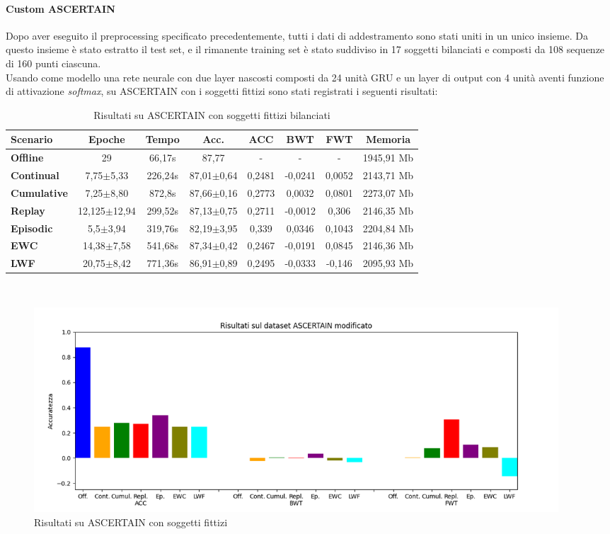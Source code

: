 \paragraph{Custom ASCERTAIN} Dopo aver eseguito il preprocessing specificato precedentemente, tutti i dati di addestramento sono stati uniti in un unico insieme. Da questo insieme è stato estratto il test set, e il rimanente training set è stato suddiviso in 17 soggetti bilanciati e composti da 108 sequenze di 160 punti ciascuna.\\
Usando come modello una rete neurale con due layer nascosti composti da 24 unità GRU e un layer di output con 4 unità aventi funzione di attivazione \textit{softmax}, su ASCERTAIN con i soggetti fittizi sono stati registrati i seguenti risultati:
\begin{table}[h]
\footnotesize
    \begin{tabular}{l|c|c|c|c|c|c|c}
        \textbf{Scenario} & \textbf{Epoche} & \textbf{Tempo} & \textbf{Acc.} & \textbf{ACC} & \textbf{BWT} & \textbf{FWT} & \textbf{Memoria}\\
        \hline
         \textbf{Offline} & 29 & 66,17s & 87,77 & - & - & - & 1945,91 Mb\\
        \textbf{Continual} & 7,75$\pm$5,33 & 226,24s & 87,01$\pm$0,64 & 0,2481 & -0,0241 & 0,0052 & 2143,71 Mb\\
        \textbf{Cumulative} & 7,25$\pm$8,80 & 872,8s & 87,66$\pm$0,16 & 0,2773 & 0,0032 & 0,0801 & 2273,07 Mb\\
        \textbf{Replay} & 12,125$\pm$12,94 & 299,52s & 87,13$\pm$0,75 & 0,2711 & -0,0012 & 0,306 & 2146,35 Mb\\
        \textbf{Episodic} & 5,5$\pm$3,94 & 319,76s & 82,19$\pm$3,95 & 0,339 & 0,0346 & 0,1043 & 2204,84 Mb\\
        \textbf{EWC} & 14,38$\pm$7,58 & 541,68s & 87,34$\pm$0,42 & 0,2467 & -0,0191 & 0,0845 & 2146,36 Mb\\
        \textbf{LWF} & 20,75$\pm$8,42 & 771,36s & 86,91$\pm$0,89 & 0,2495 & -0,0333 & -0,146 & 2095,93 Mb\\
    \end{tabular}
    \caption{Risultati su ASCERTAIN con soggetti fittizi bilanciati}
    \label{tab:rescustomascertain}
\end{table}\\
\begin{figure}[h]
	\begin{center}
		\includegraphics[width=0.95\textwidth]{img/graphs/customascertain_final_metrics.png}
		\caption{Risultati su ASCERTAIN con soggetti fittizi}
		\label{fig:customascertain_metrics_graph}
	\end{center}
\end{figure}\\
